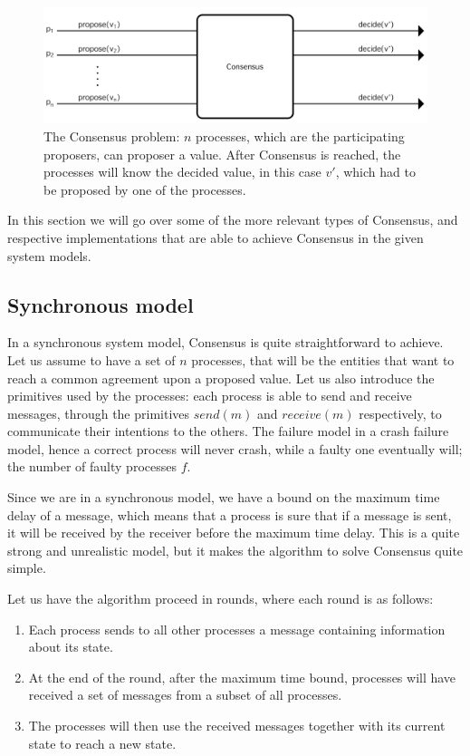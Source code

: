 \begin{figure}[htb]
  \centering
  \includegraphics[width=\textwidth,height=\textheight,keepaspectratio]{img/consensus.png}

  \caption[The architecture of the system]{ The Consensus problem: $n$ processes, which are the participating proposers, can proposer a value. After Consensus is reached, the processes will know the decided value, in this case $v'$, which had to be proposed by one of the processes. }
  \label{fig:Consensus}
\end{figure}

In this section we will go over some of the more relevant types of Consensus, and respective implementations that are able to achieve Consensus in the given system models.


\subsection{Synchronous model}\label{sec:Synchronous model}
In a synchronous system model, Consensus is quite straightforward to achieve. Let us assume to have a set of $n$ processes, that will be the entities that want to reach a common agreement upon a proposed value. Let us also introduce the primitives used by the processes: each process is able to send and receive messages, through the primitives $send(m)$ and $receive(m)$ respectively, to communicate their intentions to the others. The failure model in a crash failure model, hence a correct process will never crash, while a faulty one eventually will; the number of faulty processes $f$.

Since we are in a synchronous model, we have a bound on the maximum time delay of a message, which means that a process is sure that if a message is sent, it will be received by the receiver before the maximum time delay. This is a quite strong and unrealistic model, but it makes the algorithm to solve Consensus quite simple.

Let us have the algorithm proceed in rounds, where each round is as follows:
\begin{enumerate}
    \item Each process sends to all other processes a message containing information about its state.
    \item At the end of the round, after the maximum time bound, processes will have received a set of messages from a subset of all processes.
    \item The processes will then use the received messages together with its current state to reach a new state.
\end{enumerate}

